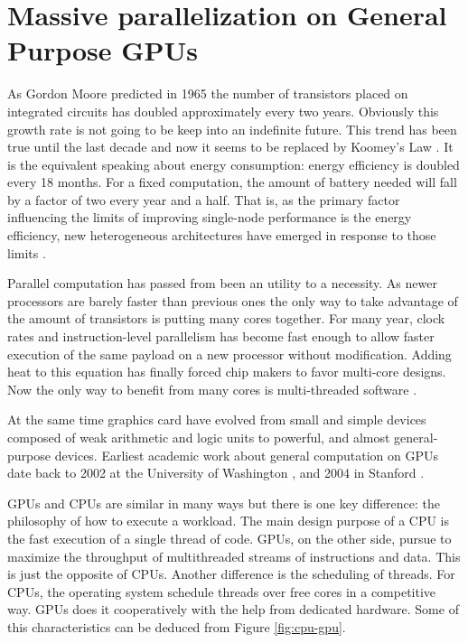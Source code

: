 \documentclass{article}
\begin{document}
\section{Massive parallelization on General Purpose GPUs}
\label{sec:parall_and_GPUs}

As Gordon Moore predicted in 1965 the number of transistors placed on
integrated circuits has doubled approximately every two years. %
Obviously this growth rate is not going to be keep into an indefinite future. This trend has been true until the last decade and now it seems to be replaced by Koomey's Law \cite{10.1109/MAHC.2010.28}. It is the equivalent speaking about energy consumption: energy efficiency is doubled every 18 months. For a fixed computation, the amount of battery needed will fall by a factor of two every year and a half. That is, as the primary factor influencing the limits of improving single-node performance is the energy efficiency, new heterogeneous architectures have emerged in response to those limits \cite{VetterHeterogeneous11}.

Parallel computation has passed from been an utility to a
necessity. As newer processors are barely faster than previous ones
the only way to take advantage of the amount of transistors is putting
many cores together. For many year, clock rates and instruction-level
parallelism has become fast enough to allow faster execution of the
same payload on a new processor without modification. Adding heat to
this equation has finally forced chip makers to favor multi-core
designs. Now the only way to benefit from many cores is multi-threaded
software \cite{6307773}.

At the same time graphics card have evolved from small and simple
devices composed of weak arithmetic and logic units to powerful, and
almost general-purpose devices. Earliest academic work about general
computation on GPUs date back to 2002 at the University of Washington
\cite{Thompson:2002:UMG:774861.774894}, and 2004 in Stanford
\cite{Buck:2004:BGS:1015706.1015800}. %

GPUs and CPUs are similar in many ways but there is one key
difference: the philosophy of how to execute a workload. The main
design purpose of a CPU is the fast execution of a single thread of
code. GPUs, on the other side, pursue to maximize the throughput of
multithreaded streams of instructions and data. This is just the
opposite of CPUs. Another difference is the scheduling of threads. For
CPUs, the operating system schedule threads over free cores in a
competitive way. GPUs does it cooperatively with the help from
dedicated hardware. Some of this characteristics can be deduced from
Figure \ref{fig:cpu-gpu}.
\end{document}
